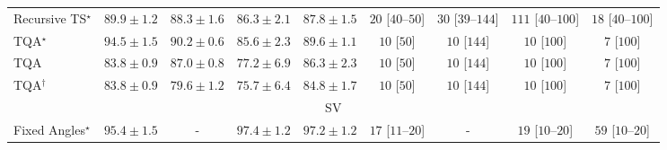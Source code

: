 \begin{tabular}{l|cccc|cccc|}
Recursive TS$^\star$ & {\cellcolor[HTML]{0B713B}} \color[HTML]{F1F1F1} $89.9\pm 1.2$ & {\cellcolor[HTML]{15793E}} \color[HTML]{F1F1F1} $88.3\pm 1.6$ & {\cellcolor[HTML]{228343}} \color[HTML]{F1F1F1} $86.3\pm 2.1$ & {\cellcolor[HTML]{187B3F}} \color[HTML]{F1F1F1} $87.8\pm 1.5$ & {\cellcolor[HTML]{FFF3EF}} \color[HTML]{000000} $20$ [$40$--$50$] & {\cellcolor[HTML]{FEF1ED}} \color[HTML]{000000} $30$ [$39$--$144$] & {\cellcolor[HTML]{FDDDD9}} \color[HTML]{000000} $111$ [$40$--$100$] & {\cellcolor[HTML]{FFF3F0}} \color[HTML]{000000} $18$ [$40$--$100$] \\
TQA$^\star$ & {\cellcolor[HTML]{005730}} \color[HTML]{F1F1F1} $94.5\pm 1.5$ & {\cellcolor[HTML]{096F3A}} \color[HTML]{F1F1F1} $90.2\pm 0.6$ & {\cellcolor[HTML]{258745}} \color[HTML]{F1F1F1} $85.6\pm 2.3$ & {\cellcolor[HTML]{0D733C}} \color[HTML]{F1F1F1} $89.6\pm 1.1$ & {\cellcolor[HTML]{FFF6F2}} \color[HTML]{000000} $10$ [$50$] & {\cellcolor[HTML]{FFF6F2}} \color[HTML]{000000} $10$ [$144$] & {\cellcolor[HTML]{FFF6F2}} \color[HTML]{000000} $10$ [$100$] & {\cellcolor[HTML]{FFF6F2}} \color[HTML]{000000} $7$ [$100$] \\
TQA & {\cellcolor[HTML]{2F944E}} \color[HTML]{F1F1F1} $83.8\pm 0.9$ & {\cellcolor[HTML]{1E8041}} \color[HTML]{F1F1F1} $87.0\pm 0.8$ & {\cellcolor[HTML]{61BB6D}} \color[HTML]{F1F1F1} $77.2\pm 6.9$ & {\cellcolor[HTML]{228343}} \color[HTML]{F1F1F1} $86.3\pm 2.3$ & {\cellcolor[HTML]{FFF6F2}} \color[HTML]{000000} $10$ [$50$] & {\cellcolor[HTML]{FFF6F2}} \color[HTML]{000000} $10$ [$144$] & {\cellcolor[HTML]{FFF6F2}} \color[HTML]{000000} $10$ [$100$] & {\cellcolor[HTML]{FFF6F2}} \color[HTML]{000000} $7$ [$100$] \\
TQA$^\dagger$ & {\cellcolor[HTML]{2F944E}} \color[HTML]{F1F1F1} $83.8\pm 0.9$ & {\cellcolor[HTML]{4AB062}} \color[HTML]{F1F1F1} $79.6\pm 1.2$ & {\cellcolor[HTML]{70C275}} \color[HTML]{000000} $75.7\pm 6.4$ & {\cellcolor[HTML]{2A8D49}} \color[HTML]{F1F1F1} $84.8\pm 1.7$ & {\cellcolor[HTML]{FFF6F2}} \color[HTML]{000000} $10$ [$50$] & {\cellcolor[HTML]{FFF6F2}} \color[HTML]{000000} $10$ [$144$] & {\cellcolor[HTML]{FFF6F2}} \color[HTML]{000000} $10$ [$100$] & {\cellcolor[HTML]{FFF6F2}} \color[HTML]{000000} $7$ [$100$] \\
\cline{1-9}
\multicolumn{9}{c}{\rule{0pt}{8pt}SV} \\
\midrule
Fixed Angles$^\star$ & {\cellcolor[HTML]{03446A}} \color[HTML]{F1F1F1} $95.4\pm 1.5$ & {\cellcolor[HTML]{000000}} \color[HTML]{F1F1F1} {\cellcolor{white}} \color{black} - & {\cellcolor[HTML]{023858}} \color[HTML]{F1F1F1} $97.4\pm 1.2$ & {\cellcolor[HTML]{02395A}} \color[HTML]{F1F1F1} $97.2\pm 1.2$ & {\cellcolor[HTML]{FFF3F0}} \color[HTML]{000000} $17$ [$11$--$20$] & {\cellcolor[HTML]{000000}} \color[HTML]{F1F1F1} {\cellcolor{white}} \color{black} - & {\cellcolor[HTML]{FFF3F0}} \color[HTML]{000000} $19$ [$10$--$20$] & {\cellcolor[HTML]{FEE9E6}} \color[HTML]{000000} $59$ [$10$--$20$] \\

\end{tabular}
